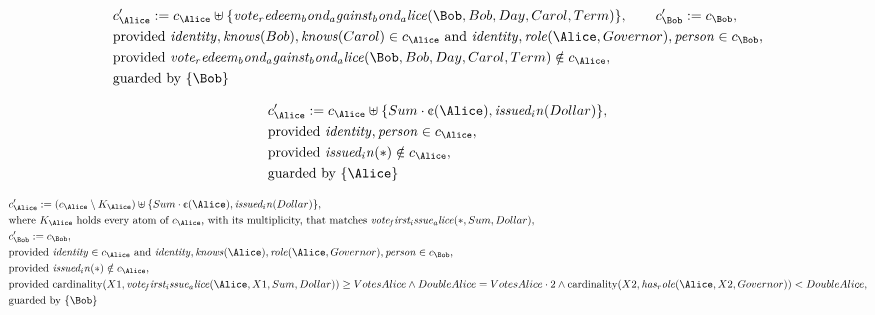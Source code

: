 \begin{align*}
&
c'_
{
\Alice
}
 := 
c_
{
\Alice
}
 \uplus 
\{
\mathit{
vote_redeem_bond_against_bond_alice
}
(
\Bob
,
Bob
,
Day
,
Carol
,
Term
)
\}
, \qquad 
c'_
{
\Bob
}
 := 
c_
{
\Bob
}
,\\
&
\text{provided } 
\mathit{
identity
}
,
\mathit{
knows
}
(
Bob
)
,
\mathit{
knows
}
(
Carol
)
 \in c_
{
\Alice
}
 \text{ and } 
\mathit{
identity
}
,
\mathit{
role
}
(
\Alice
,
Governor
)
,
\mathit{
person
}
 \in c_
{
\Bob
}
,\\
&
\text{provided } 
\mathit{
vote_redeem_bond_against_bond_alice
}
(
\Bob
,
Bob
,
Day
,
Carol
,
Term
)
 \notin c_
{
\Alice
}
,\\
&
\text{guarded by } \{
\Bob
\}
\end{align*}

\begin{align*}
&
c'_
{
\Alice
}
 := 
c_
{
\Alice
}
 \uplus 
\{
Sum
\cdot
\text{\textcent}
(
\Alice
)
,
\mathit{
issued_in
}
(
Dollar
)
\}
,\\
&
\text{provided } 
\mathit{
identity
}
,
\mathit{
person
}
 \in c_
{
\Alice
}
,\\
&
\text{provided } 
\mathit{
issued_in
}
(
\ast
)
 \notin c_
{
\Alice
}
,\\
&
\text{guarded by } \{
\Alice
\}
\end{align*}

\begin{align*}
&
c'_
{
\Alice
}
 := 
(
c_
{
\Alice
}
 \setminus K_
{
\Alice
}
) \uplus 
\{
Sum
\cdot
\text{\textcent}
(
\Alice
)
,
\mathit{
issued_in
}
(
Dollar
)
\}
,\\
&
\text{where } K_
{
\Alice
}
 \text{ holds every atom of } c_
{
\Alice
}
 \text{, with its multiplicity, that matches } 
\mathit{
vote_first_issue_alice
}
(
\ast
,
Sum
,
Dollar
)
,\\
&
c'_
{
\Bob
}
 := 
c_
{
\Bob
}
,\\
&
\text{provided } 
\mathit{
identity
}
 \in c_
{
\Alice
}
 \text{ and } 
\mathit{
identity
}
,
\mathit{
knows
}
(
\Alice
)
,
\mathit{
role
}
(
\Alice
,
Governor
)
,
\mathit{
person
}
 \in c_
{
\Bob
}
,\\
&
\text{provided } 
\mathit{
issued_in
}
(
\ast
)
 \notin c_
{
\Alice
}
,\\
&
\text{provided } 
\mathrm{cardinality}(
X1
,
\mathit{
vote_first_issue_alice
}
(
\Alice
,
X1
,
Sum
,
Dollar
)
)
\ge
VotesAlice
\land
DoubleAlice
=
VotesAlice
\cdot
2
\land
\mathrm{cardinality}(
X2
,
\mathit{
has_role
}
(
\Alice
,
X2
,
Governor
)
)
<
DoubleAlice
,\\
&
\text{guarded by } \{
\Bob
\}
\end{align*}
